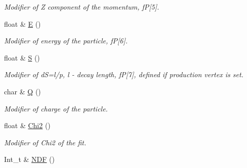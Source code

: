 \begin{DoxyCompactItemize}
\begin{DoxyCompactList}\small\item\em Modifier of Z component of the momentum, fP\mbox{[}5\mbox{]}. \end{DoxyCompactList}\item 
float \& \hyperlink{classKFParticleBase_a6b74a8cd2c67e8616dcf220e1831eb66}{E} ()\hypertarget{classKFParticleBase_a6b74a8cd2c67e8616dcf220e1831eb66}{}\label{classKFParticleBase_a6b74a8cd2c67e8616dcf220e1831eb66}

\begin{DoxyCompactList}\small\item\em Modifier of energy of the particle, fP\mbox{[}6\mbox{]}. \end{DoxyCompactList}\item 
float \& \hyperlink{classKFParticleBase_a1fab82a64b124fadb03e56a07ca6b932}{S} ()\hypertarget{classKFParticleBase_a1fab82a64b124fadb03e56a07ca6b932}{}\label{classKFParticleBase_a1fab82a64b124fadb03e56a07ca6b932}

\begin{DoxyCompactList}\small\item\em Modifier of dS=l/p, l -\/ decay length, fP\mbox{[}7\mbox{]}, defined if production vertex is set. \end{DoxyCompactList}\item 
char \& \hyperlink{classKFParticleBase_a8342e9d9208e37623a3589be872d75ad}{Q} ()\hypertarget{classKFParticleBase_a8342e9d9208e37623a3589be872d75ad}{}\label{classKFParticleBase_a8342e9d9208e37623a3589be872d75ad}

\begin{DoxyCompactList}\small\item\em Modifier of charge of the particle. \end{DoxyCompactList}\item 
float \& \hyperlink{classKFParticleBase_ac0bc1d1239aaa0b25c68f95331963a21}{Chi2} ()\hypertarget{classKFParticleBase_ac0bc1d1239aaa0b25c68f95331963a21}{}\label{classKFParticleBase_ac0bc1d1239aaa0b25c68f95331963a21}

\begin{DoxyCompactList}\small\item\em Modifier of Chi2 of the fit. \end{DoxyCompactList}\item 
Int\+\_\+t \& \hyperlink{classKFParticleBase_a35401dc9615a4181f437ba5e7015ff9a}{N\+DF} ()\hypertarget{classKFParticleBase_a35401dc9615a4181f437ba5e7015ff9a}{}\label{classKFParticleBase_a35401dc9615a4181f437ba5e7015ff9a}


\end{DoxyCompactItemize}
